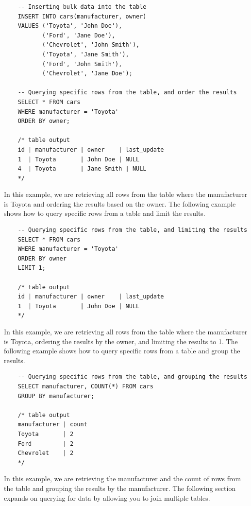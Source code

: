 \begin{verbatim}
    -- Inserting bulk data into the table
    INSERT INTO cars(manufacturer, owner)
    VALUES ('Toyota', 'John Doe'),
           ('Ford', 'Jane Doe'),
           ('Chevrolet', 'John Smith'),
           ('Toyota', 'Jane Smith'),
           ('Ford', 'John Smith'),
           ('Chevrolet', 'Jane Doe');

    -- Querying specific rows from the table, and order the results
    SELECT * FROM cars
    WHERE manufacturer = 'Toyota'
    ORDER BY owner;

    /* table output
    id | manufacturer | owner    | last_update
    1  | Toyota       | John Doe | NULL
    4  | Toyota       | Jane Smith | NULL
    */
\end{verbatim}

In this example, we are retrieving all rows from the table where the manufacturer is Toyota and ordering the results based on the owner. The following example shows how to query specific rows from a table and limit the results.

\begin{verbatim}
    -- Querying specific rows from the table, and limiting the results
    SELECT * FROM cars
    WHERE manufacturer = 'Toyota'
    ORDER BY owner
    LIMIT 1;

    /* table output
    id | manufacturer | owner    | last_update
    1  | Toyota       | John Doe | NULL
    */
\end{verbatim}

In this example, we are retrieving all rows from the table where the manufacturer is Toyota, ordering the results by the owner, and limiting the results to 1. The following example shows how to query specific rows from a table and group the results.

\begin{verbatim}
    -- Querying specific rows from the table, and grouping the results
    SELECT manufacturer, COUNT(*) FROM cars
    GROUP BY manufacturer;

    /* table output
    manufacturer | count
    Toyota       | 2
    Ford         | 2
    Chevrolet    | 2
    */
\end{verbatim}

In this example, we are retrieving the manufacturer and the count of rows from the table and grouping the results by the manufacturer. The following section expands on querying for data by allowing you to join multiple tables.

